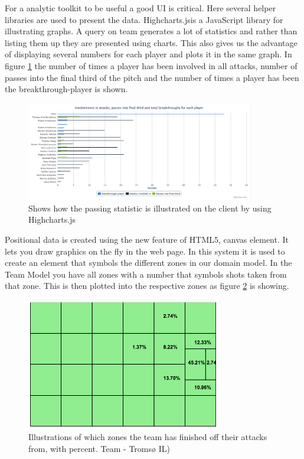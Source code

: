 For a analytic toolkit to be useful a good UI is critical. Here several helper libraries are used to present the data. Highcharts.js\footnotemark is a JavaScript library for illustrating graphs. A query on team generates a lot of statistics and rather than listing them up they are presented using charts. This also gives us the advantage of displaying several numbers for each player and plots it in the same graph. In figure \ref{fig:chart} the number of times a player has been involved in all attacks, number of passes into the final third of the pitch and the number of times a player has been the breakthrough-player is shown.


\begin{figure}[ht!]
\centering
\includegraphics[width=100mm]{images/general/chart_passes.png}
\caption{Shows how the passing statistic is illustrated on the client by using Highcharts.js}
\label{fig:chart}
\end{figure}

Positional data is created using the new feature of HTML5, canvas element. It lets you draw graphics on the fly in the web page. In this system it is used to create an element that symbols the different zones in our domain model. In the Team Model you have all zones with a number that symbols shots taken from that zone. This is then plotted into the respective zones as figure \ref{fig:attacking_zones} is showing.

\begin{figure}[ht!]
\centering
\includegraphics[width=85mm]{images/general/finishing_zones.png}
\caption{Illustrations of which zones the team has finished off their attacks from, with percent. Team - Tromsø IL)}
\label{fig:attacking_zones}
\end{figure}

